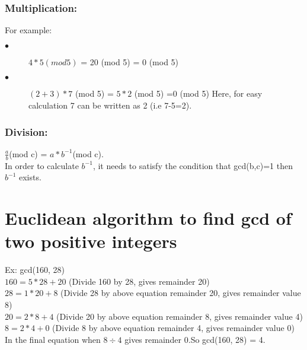 \documentclass{article}
\begin{document}
   \subsubsection{Multiplication:}
   For example:
  \begin{description}
	\item[$ \bullet$] $4*5 (mod 5)$ = 20 (mod 5) = 0 (mod 5)
	\item[$ \bullet$] $(2+3)*7$ (mod 5) = $5*2$ (mod 5) =0 (mod 5)
     Here, for easy calculation 7 can be written as 2 (i.e 7-5=2).
\end{description}
   \subsubsection{Division:}
   $ \frac{a}{b }$(mod c) = $a*b^{-1}$(mod c).\\
   In order to calculate $b^{-1}$, it needs to satisfy the condition that gcd(b,c)=1 then $b^{-1}$ exists.

\section{Euclidean algorithm to find gcd of two positive integers}
Ex: gcd(160, 28)\\

\quad$160=5*28+20$  (Divide 160 by 28, gives remainder 20)\\

\quad$28=1*20+8$  (Divide 28 by above equation remainder 20, gives remainder value 8)\\

\quad$20=2*8+4$  (Divide 20 by above equation remainder 8, gives remainder value 4)\\

\quad$8=2*4+0$  (Divide 8 by above equation remainder 4, gives remainder value 0)\\
In the final equation when  $8\div4$ gives remainder 0.So gcd(160, 28) = 4.
\end{document}
